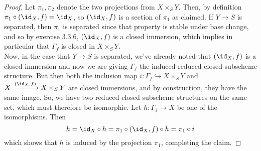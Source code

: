 \begin{proof}
	Let $\pi_1,\pi_2$ denote the two projections from $X \times_S Y$. Then, by definition $\pi_1 \circ (\id_X,f) = \id_X$, so $(\id_X,f)$ is a section of $\pi_1$ as claimed. If $Y \to S$ is separated, then $\pi_1$ is separated since that property is stable under base change, and so by exercise 3.3.6, $(\id_X,f)$ is a closed immersion, which implies in particular that $\Gamma_f$ is closed in $X \times_S Y$. \\
	
	Now, in the case that $Y \to S$ is separated, we've already noted that $(\id_X,f)$ is a closed immersion and now we are giving $\Gamma_f$ the induced reduced closed subscheme structure. But then both the inclusion map $i : \Gamma_f \hookrightarrow X \times_S Y$ and $X \xrightarrow{(\id_X,f)} X \times_S Y$ are closed immersions, and by construction, they have the same image. So, we have two reduced closed subscheme structures on the same set, which must therefore be isomorphic. Let $h : \Gamma_f \to X$ be one of the isomorphisms. Then
	\[ h = \id_X \circ h = \pi_1 \circ (\id_X,f) \circ h = \pi_1 \circ i \]
	which shows that $h$ is induced by the projection $\pi_1$, completing the claim.
\end{proof}
